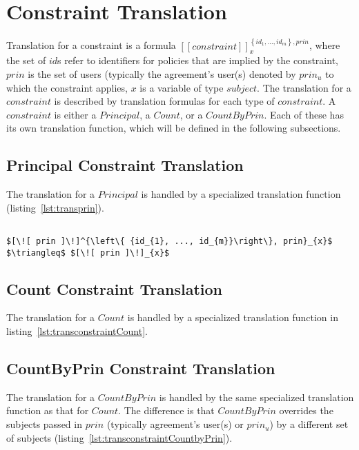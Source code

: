 \section{Constraint Translation}

Translation for a constraint is a formula $[\![constraint]\!]^{\left\{ {id_{1}, ..., id_{m}}\right\}, prin}_{x}$, where the set of $id$s refer to identifiers for policies that are implied by the constraint, $prin$ is the set of users (typically the agreement's user(s) denoted by $prin_{u}$ to which the constraint applies, $x$ is a variable of type $subject$. The translation for a $constraint$ is described by translation formulas for each type of $constraint$. A $constraint$ is either a $Principal$, a $Count$, or a $CountByPrin$. Each of these has its own translation function, which will be defined in the following subsections.

\subsection{Principal Constraint Translation}
The translation for a $Principal$ is handled by a specialized translation function (listing~\ref{lst:transprin}).   

\lstset{mathescape, language=AST}  
\begin{lstlisting}[frame=single, caption={Constraint Translation {$\colon$} Principal},label={lst:transconstraintPrin}]

$[\![ prin ]\!]^{\left\{ {id_{1}, ..., id_{m}}\right\}, prin}_{x}$ $\triangleq$ $[\![ prin ]\!]_{x}$ 
\end{lstlisting}

\subsection{Count Constraint Translation}
The translation for a $Count$ is handled by a specialized translation function in listing~\ref{lst:transconstraintCount}. 


\subsection{CountByPrin Constraint Translation}
The translation for a $CountByPrin$ is handled by the same specialized translation function as that for $Count$. The difference is that $CountByPrin$ overrides the subjects passed in $prin$ (typically agreement's user(s) or $prin_{u}$) by a different set of subjects (listing~\ref{lst:transconstraintCountbyPrin}).

